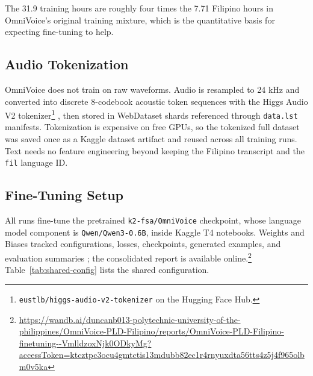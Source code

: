 \documentclass[sigconf,nonacm]{acmart}
\begin{document}
The 31.9 training hours are roughly four times the 7.71 Filipino hours in OmniVoice's original training mixture, which is the quantitative basis for expecting fine-tuning to help.

\subsection{Audio Tokenization}

OmniVoice does not train on raw waveforms. Audio is resampled to 24 kHz and converted into discrete 8-codebook acoustic token sequences with the Higgs Audio V2 tokenizer\footnote{\texttt{eustlb/higgs-audio-v2-tokenizer} on the Hugging Face Hub.} \cite{higgsaudio}, then stored in WebDataset shards referenced through \texttt{data.lst} manifests. Tokenization is expensive on free GPUs, so the tokenized full dataset was saved once as a Kaggle dataset artifact and reused across all training runs. Text needs no feature engineering beyond keeping the Filipino transcript and the \texttt{fil} language ID.

\subsection{Fine-Tuning Setup}

All runs fine-tune the pretrained \texttt{k2-fsa/OmniVoice} checkpoint, whose language model component is \texttt{Qwen/Qwen3-0.6B}, inside Kaggle T4 notebooks. Weights and Biases tracked configurations, losses, checkpoints, generated examples, and evaluation summaries \cite{wandb}; the consolidated report is available online.\footnote{\url{https://wandb.ai/duncanb013-polytechnic-university-of-the-philippines/OmniVoice-PLD-Filipino/reports/OmniVoice-PLD-Filipino-finetuning--VmlldzoxNjk0ODkyMg?accessToken=ktcztpc3ocu4gmtctis13mdubb82ec1r4rnyuxdta56tts4z5j4f965olbm0v5ka}} Table~\ref{tab:shared-config} lists the shared configuration.
\end{document}
